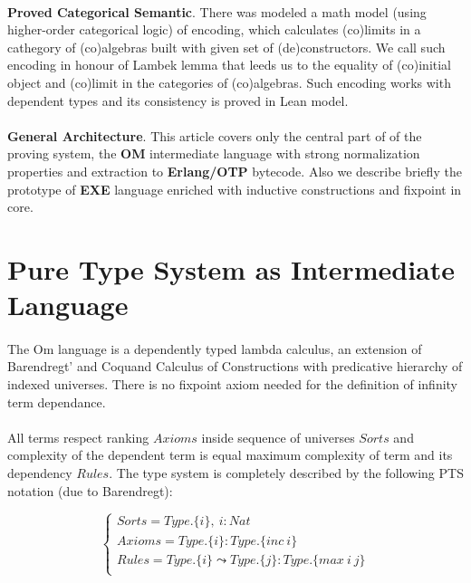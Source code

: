 \documentclass[11pt,oneside]{article}
\begin{document}
\paragraph{}
{\bf Proved Categorical Semantic}. There was modeled a math model (using
higher-order categorical logic) of encoding, which calculates (co)limits in a
cathegory of (co)algebras built with given set of (de)constructors.
We call such encoding in honour of Lambek lemma that leeds us to the
equality of (co)initial object and (co)limit in the categories of (co)algebras.
Such encoding works with dependent types and its consistency is proved in Lean model.

\paragraph{}
{\bf General Architecture}. This article covers only the central part of
of the proving system, the {\bf OM} intermediate language with strong
normalization properties and extraction to {\bf Erlang/OTP} bytecode.
Also we describe briefly the prototype of {\bf EXE} language enriched
with inductive constructions and fixpoint in core.

\newpage
\section{Pure Type System as Intermediate Language}

   \paragraph{}
   The Om language is a dependently typed lambda calculus, an extension of Barendregt'
   and Coquand Calculus of Constructions with predicative hierarchy of indexed universes.
   There is no fixpoint axiom needed for the definition of infinity term dependance.

   \paragraph{}
   All terms respect ranking $Axioms$ inside sequence of universes $Sorts$ and complexity of the
   dependent term is equal maximum complexity of term and its dependency $Rules$. The type
   system is completely described by the following PTS notation (due to Barendregt):

$$
\begin{cases}
    Sorts = Type.\{i\},\ i : Nat\\
    Axioms = Type.\{i\} : Type.\{inc\ i\}\\
    Rules = Type.\{i\} \leadsto Type.\{j\} : Type.\{max\ i\ j\}\\
\end{cases}
$$
\end{document}
